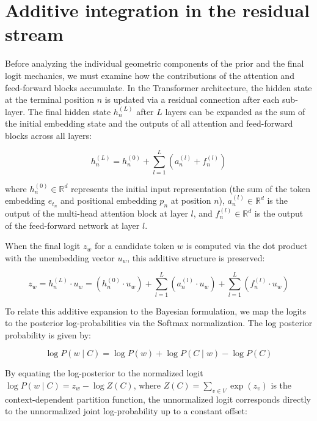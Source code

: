 \documentclass[11pt,a4paper]{article}
\begin{document}
	\section{Additive integration in the residual stream}
	
	Before analyzing the individual geometric components of the prior and the final logit mechanics, we must examine how the contributions of the attention and feed-forward blocks accumulate. In the Transformer architecture, the hidden state at the terminal position $n$ is updated via a residual connection after each sub-layer. The final hidden state $h_n^{(L)}$ after $L$ layers can be expanded as the sum of the initial embedding state and the outputs of all attention and feed-forward blocks across all layers:
	
	\begin{equation}
		h_n^{(L)} = h_n^{(0)} + \sum_{l=1}^L \left( a_n^{(l)} + f_n^{(l)} \right)
	\end{equation}
	
	where $h_n^{(0)} \in \mathbb{R}^d$ represents the initial input representation (the sum of the token embedding $e_{t_n}$ and positional embedding $p_n$ at position $n$), $a_n^{(l)} \in \mathbb{R}^d$ is the output of the multi-head attention block at layer $l$, and $f_n^{(l)} \in \mathbb{R}^d$ is the output of the feed-forward network at layer $l$. 
	
	When the final logit $z_w$ for a candidate token $w$ is computed via the dot product with the unembedding vector $u_w$, this additive structure is preserved:
	
	\begin{equation}
		\boxed{z_w = h_n^{(L)} \cdot u_w = \left( h_n^{(0)} \cdot u_w \right) + \sum_{l=1}^L \left( a_n^{(l)} \cdot u_w \right) + \sum_{l=1}^L \left( f_n^{(l)} \cdot u_w \right)}
	\end{equation}
	
	To relate this additive expansion to the Bayesian formulation, we map the logits to the posterior log-probabilities via the Softmax normalization. The log posterior probability is given by:
	
	\begin{equation}
		\log P(w \mid C) = \log P(w) + \log P(C \mid w) - \log P(C)
	\end{equation}
	
	By equating the log-posterior to the normalized logit $\log P(w \mid C) = z_w - \log Z(C)$, where $Z(C) = \sum_{v \in V} \exp(z_v)$ is the context-dependent partition function, the unnormalized logit corresponds directly to the unnormalized joint log-probability up to a constant offset:
	
\end{document}
